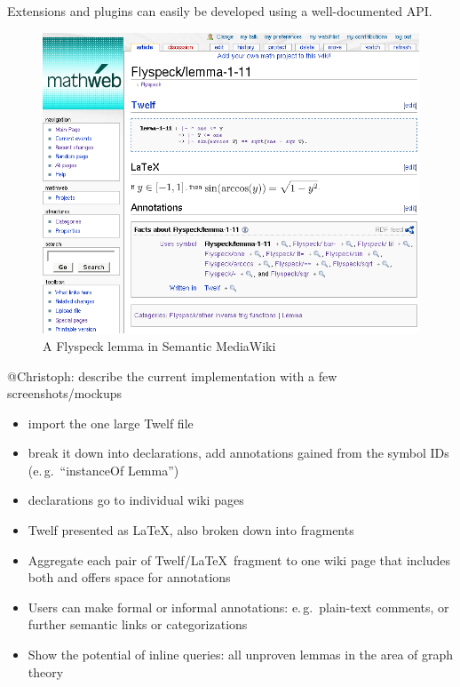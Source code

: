 \documentclass{llncs}
\begin{document}
Extensions and plugins can easily be developed using a well-documented API.

\begin{figure}
  \centering
  \includegraphics[width=\textwidth]{smw-lemma}
  \caption{A Flyspeck lemma in Semantic MediaWiki}
  \label{fig:smw-lemma}
\end{figure}

\begin{todo}{@Christoph: describe the current implementation with a few
    screenshots/mockups}
  \begin{itemize}
  \item import the one large Twelf file
  \item break it down into declarations, add annotations gained from the symbol IDs
    (e.\,g.\ ``instanceOf Lemma'')
  \item declarations go to individual wiki pages
  \item Twelf presented as \LaTeX, also broken down into fragments
  \item Aggregate each pair of Twelf/\LaTeX\ fragment to one wiki page that includes both
    and offers space for annotations
  \item Users can make formal or informal annotations: e.\,g.\ plain-text comments, or
    further semantic links or categorizations
  \item Show the potential of inline queries: all unproven lemmas in the area of graph
    theory
  \end{itemize}
\end{todo}
\end{document}
